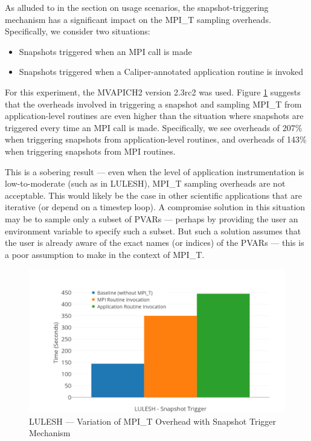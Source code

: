 \par As alluded to in the section on usage scenarios, the snapshot-triggering mechanism has a significant impact on the MPI\_T sampling overheads. Specifically, we consider two situations:
\begin{itemize}
\item Snapshots triggered when an MPI call is made
\item Snapshots triggered when a Caliper-annotated application routine is invoked
\end{itemize}
For this experiment, the MVAPICH2 version 2.3rc2 was used. Figure \ref{fig:cali-overhead-snapshot} suggests that the overheads involved in triggering a snapshot and sampling MPI\_T from application-level routines are even higher than the situation where snapshots are triggered every time an MPI call is made. Specifically, we see overheads of 207\% when triggering snapshots from application-level routines, and overheads of 143\% when triggering snapshots from MPI routines. 
\par This is a sobering result --- even when the level of application instrumentation is low-to-moderate (such as in LULESH), MPI\_T sampling overheads are not acceptable. This would likely be the case in other scientific applications that are iterative (or depend on a timestep loop). A compromise solution in this situation may be to sample only a subset of PVARs --- perhaps by providing the user an environment variable to specify such a subset. But such a solution assumes that the user is already aware of the exact names (or indices) of the PVARs --- this is a poor assumption to make in the context of MPI\_T.
\begin{center}
	\begin{figure}[bp!]
         \centering
  \captionsetup{justification=centering}
		\includegraphics[scale=0.8, width=\columnwidth, keepaspectratio]{figures/CALIPER_overheads_snapshot_trigger}
		\caption{LULESH --- Variation of MPI\_T Overhead with Snapshot Trigger Mechanism}
		\label{fig:cali-overhead-snapshot}
	\end{figure}
\end{center}

